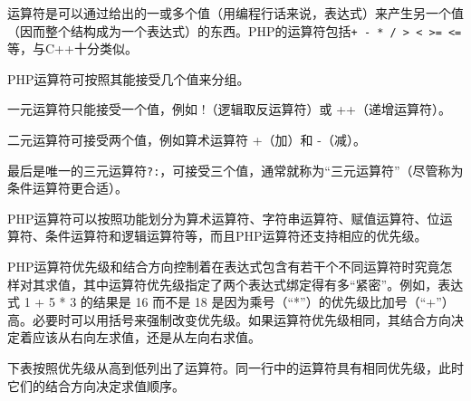 运算符是可以通过给出的一或多个值（用编程行话来说，表达式）来产生另一个值（因而整个结构成为一个表达式）的东西。PHP的运算符包括\verb|+ - * / > < >= <=|等，与C++十分类似。

PHP运算符可按照其能接受几个值来分组。

\begin{compactitem}
\item 一元运算符只能接受一个值，例如 !（逻辑取反运算符）或 +\/+（递增运算符）。
\item 二元运算符可接受两个值，例如算术运算符 +（加）和 -（减）。
\item 最后是唯一的三元运算符\texttt{?:}，可接受三个值，通常就称为“三元运算符”（尽管称为条件运算符更合适）。
\end{compactitem}

PHP运算符可以按照功能划分为算术运算符、字符串运算符、赋值运算符、位运算符、条件运算符和逻辑运算符等，而且PHP运算符还支持相应的优先级。




PHP运算符优先级和结合方向控制着在表达式包含有若干个不同运算符时究竟怎样对其求值，其中运算符优先级指定了两个表达式绑定得有多“紧密”。例如，表达式 1 + 5 * 3 的结果是 16 而不是 18 是因为乘号（“*”）的优先级比加号（“+”）高。必要时可以用括号来强制改变优先级。如果运算符优先级相同，其结合方向决定着应该从右向左求值，还是从左向右求值。


下表按照优先级从高到低列出了运算符。同一行中的运算符具有相同优先级，此时它们的结合方向决定求值顺序。

